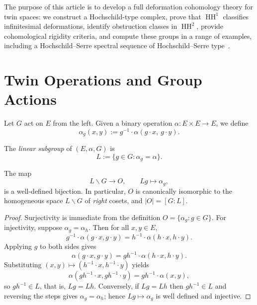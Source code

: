 \documentclass[11pt,a4paper]{article}
\numberwithin{equation}{section}
\DeclareMathOperator{\HH}{HH}
\newcommand{\TwinSpace}{(E,\alpha,G)}
\newcommand{\TwinOrbit}{O}
\newcommand{\LinearSubgroup}{L}
\newcommand{\abs}[1]{\left\lvert #1 \right\rvert}
\begin{document}
	The purpose of this article is to develop a full deformation cohomology theory for twin spaces:
	we construct a Hochschild-type complex, prove that $\HH^1$ classifies infinitesimal deformations,
	identify obstruction classes in $\HH^2$, provide cohomological rigidity criteria,
	and compute these groups in a range of examples, including a Hochschild--Serre spectral sequence
	of Hochschild--Serre type~\cite{HochschildSerre1953}.
	
	\section{Twin Operations and Group Actions}
	\label{sec:twin}
	
	Let $G$ act on $E$ from the left.  
	Given a binary operation $\alpha : E\times E \to E$, we define
	\begin{equation}\label{eq:twin-op}
		\alpha_g(x,y) := g^{-1}\cdot \alpha(g\cdot x,\ g\cdot y).
	\end{equation}
	
	\begin{definition}
		The \emph{linear subgroup} of $\TwinSpace$ is
		\[
		\LinearSubgroup := \{g\in G : \alpha_g = \alpha\}.
		\]
	\end{definition}
	
	\begin{proposition}\label{prop:orbit}
		The map
		\[
		\LinearSubgroup\backslash G \longrightarrow \TwinOrbit, \qquad \LinearSubgroup g \mapsto \alpha_g,
		\]
		is a well-defined bijection.
		In particular, $\TwinOrbit$ is canonically isomorphic to the homogeneous space $\LinearSubgroup\backslash G$ of \emph{right} cosets, and $\abs{\TwinOrbit}=[G:\LinearSubgroup]$.
	\end{proposition}
	
	\begin{proof}
		Surjectivity is immediate from the definition $\TwinOrbit=\{\alpha_g : g\in G\}$.
		For injectivity, suppose $\alpha_g=\alpha_h$.
		Then for all $x,y\in E$,
		\[
		g^{-1}\cdot \alpha(g\cdot x,g\cdot y)
		=
		h^{-1}\cdot \alpha(h\cdot x,h\cdot y).
		\]
		Applying $g$ to both sides gives
		\[
		\alpha(g\cdot x,g\cdot y)
		=
		gh^{-1}\cdot \alpha(h\cdot x,h\cdot y).
		\]
		Substituting $(x,y)\mapsto(h^{-1}\cdot x,h^{-1}\cdot y)$ yields
		\[
		\alpha(gh^{-1}\cdot x,gh^{-1}\cdot y)
		=
		gh^{-1}\cdot \alpha(x,y),
		\]
		so $gh^{-1}\in \LinearSubgroup$, that is, $\LinearSubgroup g=\LinearSubgroup h$.
		Conversely, if $\LinearSubgroup g=\LinearSubgroup h$ then $gh^{-1}\in\LinearSubgroup$ and reversing the steps gives $\alpha_g=\alpha_h$; hence $\LinearSubgroup g\mapsto\alpha_g$ is well defined and injective.
	\end{proof}
	
\end{document}
